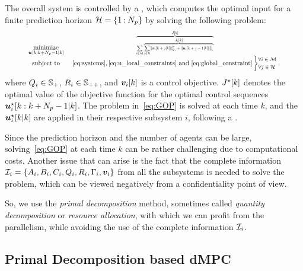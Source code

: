 \documentclass{ifacconf}  %
\begin{document}
The overall system is controlled by a \mpc{}, which
computes the optimal input for a finite prediction horizon ${\mathcal{H}=\{1\mathbin{:}N_{p}\}}$ by solving the following problem:
\begin{equation}\label{eq:GOP}
\resizebox{.88\columnwidth}{!}{$
\begin{matrix}
\underset{\useq}{\mathrm{minimize}}&\resizebox{0.35\textwidth}{!}{$\overbrace{\sum\limits_{i\in\set{M}} \overbrace{\sum_{j\in\set{H}}\norm{\mpcvec{v}[i][k+j][k]}^{2}_{Q_i}+\norm{\mpcvec{u}[i][k+j-1][k]}^{2}_{R_i}}^{\textstyle{} \obji}}^{\textstyle{} \globobj}$}\\
\mathrm{subject~ to}&~\eqref{eq:systems},\eqref{eq:u_local_constraints}\ \mathrm{and}\ \eqref{eq:global_constraint}
\left\}\small
\begin{aligned}
  &\forall i\in\set{M}\\
  &\forall j\in\set{H}
\end{aligned}\right.,

\end{matrix}
  $}
\end{equation}
where ${Q_{i}\in\mathbb{S}_{+}}$, ${R_{i}\in\mathbb{S}_{++}}$, and $\vik$ is a control objective.
$\optglobobj$ denotes the optimal value of the objective function for the optimal control sequences ${\optuiseq}$.
The problem in~\eqref{eq:GOP} is solved at each time $k$, and the ${\optuikk}$ are applied in their respective subsystem $i$, following a \rhs{}.

Since the prediction horizon and the number of agents can be large, solving~\eqref{eq:GOP} at each time $k$ can be rather challenging due to computational costs.
Another issue that can arise is the fact that the complete information ${\mathcal{I}_i=\{A_i,B_i,C_i,Q_i,R_i,\Gamma_i,\boldsymbol{v}_i\}}$ from all the subsystems is needed to solve the problem,
which can be viewed negatively from a confidentiality point of view.

So, we use the \emph{primal decomposition} method, sometimes called \emph{quantity decomposition} or \emph{resource allocation}, with which we can profit from the parallelism, while avoiding the use of the complete information $\mathcal{I}_{i}$.

\subsection{Primal Decomposition based dMPC}\label{ssec:dMPC}
\end{document}
